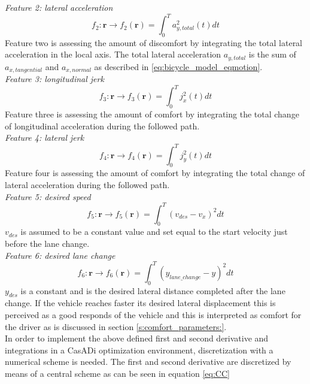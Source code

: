 \textit{Feature 2: lateral acceleration}
\begin{equation}\label{eq:flat_acc}
f_{2}:\bm{r}\xrightarrow{}f_2(\bm{r})=\int_{0}^{T}a_{y,total}^{2}(t) dt
\end{equation}
Feature two is assessing the amount of discomfort by integrating the total lateral acceleration in the local axis. The total lateral acceleration  $a_{y,total} $ is the sum of  $ a_{x,tangential}$ and $a_{x,normal}$ as described in \ref{eq:bicycle_model_eqmotion}.\\

\textit{Feature 3: longitudinal jerk}
\begin{equation}\label{eq:flong_jerk}
f_{3}:\bm{r}\xrightarrow{}f_3(\bm{r})=\int_{0}^{T}j_x^{2}(t) dt
\end{equation}
Feature three is assessing the amount of comfort by integrating the total change of longitudinal acceleration during the followed path. \\

\textit{Feature 4: lateral jerk}
\begin{equation}\label{eq:flat_jerk}
f_{4}:\bm{r}\xrightarrow{}f_4(\bm{r})=\int_{0}^{T}j_y^{2}(t) dt
\end{equation}
Feature four is assessing the amount of comfort by integrating the total change of lateral acceleration during the followed path. \\

\textit{Feature 5: desired speed}
\begin{equation}\label{eq:des_speed}
f_{5}:\bm{r}\xrightarrow{}f_5(\bm{r})=\int_{0}^{T}(v_{des}-v_x)^2 dt
\end{equation}
$v_{des}$ is assumed to be a constant value and set equal to the start velocity just before the lane change.\\

\textit{Feature 6: desired lane change}
\begin{equation}\label{eq:des_lane_change}
f_{6}:\bm{r}\xrightarrow{}f_6(\bm{r})=\int_{0}^{T}(y_{lane\_change}-y)^2 dt
\end{equation}
$y_{des}$ is a constant and is the desired lateral distance completed after the lane change. If the vehicle reaches faster its desired lateral displacement this is perceived as a good responds of the vehicle and this is interpreted as comfort for the driver as is discussed in section \ref{s:comfort_parameters:}.
\\

In order to implement the above defined first and second derivative and integrations in a CasADi optimization environment, discretization with a numerical scheme is needed. The first and second derivative are discretized by means of a central scheme as can be seen in equation \ref{eq:CC}


